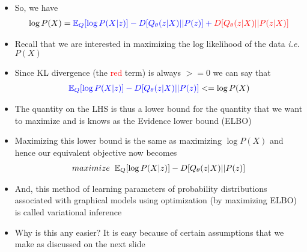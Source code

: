 \begin{frame}
			\begin{itemize}[<+->]\justifying
				\item So, we have 
				\begin{align*}
				\log P(X) = \color{blue}\mathbb{E}_Q[\log P(X|z)] - D [Q_\theta(z|X) || P(z)] + \color{red}D[Q_\theta(z|X)||P(z|X)]\color{black}
				\end{align*}
				\item Recall that we are interested in maximizing the log likelihood 					of the data \textit{i.e. } $P(X)$
				\item Since KL divergence (the \textcolor{red}{red} term) is always $>= 0$ we can say that
				\vspace{-0.1cm}
				\begin{align*}
					\color{blue}\mathbb{E}_Q[\log P(X|z)] - D [Q_\theta(z|X) || P(z)] \color{black}<= \log P(X)
				\end{align*}	
				\vspace{-0.5cm}
				\item The quantity on the LHS is thus a lower bound for the quantity that we want to maximize and is knows as the Evidence lower bound (ELBO)
				\item Maximizing this lower bound is the same as maximizing $\log P(X)$ and hence our equivalent objective now becomes
				\vspace{-0.1cm}
				\begin{align*}
				maximize \hspace{0.2cm}\mathbb{E}_Q[\log P(X|z)] - D [Q_\theta(z|X) || P(z)]
				\end{align*}
				\vspace{-0.5cm}
				\item And, this method of learning parameters of probability distributions associated with graphical models using optimization (by maximizing ELBO) is called variational inference
				\item Why is this any easier? It is easy because of certain assumptions that we make as discussed on the next slide
			\end{itemize}
\end{frame}


